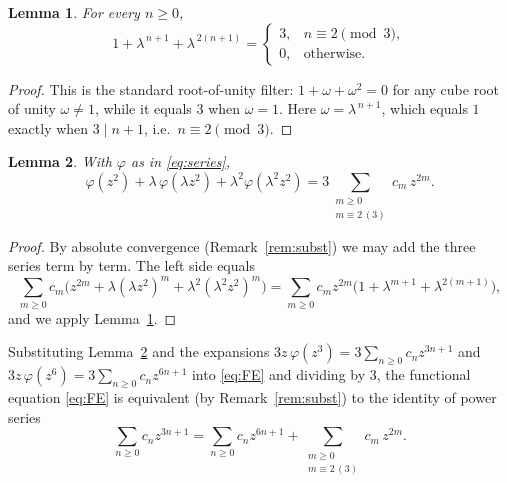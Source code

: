 \documentclass{amsart}
\newtheorem{lemma}{Lemma}
\theoremstyle{remark}
\begin{document}
\begin{lemma}\label{lem:sym}
For every $n\ge 0$,
\[
1+\lambda^{\,n+1}+\lambda^{\,2(n+1)}=
\begin{cases}
3,& n\equiv 2 \pmod 3,\\[2pt]
0,& \text{otherwise.}
\end{cases}
\]
\end{lemma}
\begin{proof}
This is the standard root-of-unity filter: $1+\omega+\omega^2=0$ for any cube root of unity
$\omega\ne 1$, while it equals $3$ when $\omega=1$. Here $\omega=\lambda^{\,n+1}$, which equals
$1$ exactly when $3\mid n+1$, i.e.\ $n\equiv 2\pmod 3$.
\end{proof}

\begin{lemma}\label{lem:terms}
With $\varphi$ as in \eqref{eq:series},
\[
\varphi(z^2)+\lambda\,\varphi(\lambda z^2)+\lambda^2\varphi(\lambda^2 z^2)
=3\!\!\sum_{\substack{m\ge 0\\ m\equiv 2\,(3)}}\!\! c_m\,z^{2m}.
\]
\end{lemma}
\begin{proof}
By absolute convergence (Remark~\ref{rem:subst}) we may add the three series term by term. The left
side equals
\[
\sum_{m\ge 0} c_m\bigl(z^{2m}+\lambda(\lambda z^2)^m+\lambda^2(\lambda^2 z^2)^m\bigr)
=\sum_{m\ge0}c_m z^{2m}\bigl(1+\lambda^{m+1}+\lambda^{2(m+1)}\bigr),
\]
and we apply Lemma~\ref{lem:sym}.
\end{proof}

Substituting Lemma~\ref{lem:terms} and the expansions
$3z\,\varphi(z^3)=3\sum_{n\ge0}c_n z^{3n+1}$ and
$3z\,\varphi(z^6)=3\sum_{n\ge0}c_n z^{6n+1}$ into \eqref{eq:FE} and dividing by $3$, the
functional equation \eqref{eq:FE} is equivalent (by Remark~\ref{rem:subst}) to the identity of power
series
\begin{equation}\label{eq:three}
\sum_{n\ge0}c_n z^{3n+1}
=\sum_{n\ge0}c_n z^{6n+1}
+\!\!\sum_{\substack{m\ge0\\ m\equiv2\,(3)}}\!\! c_m\,z^{2m}.
\end{equation}
\end{document}
